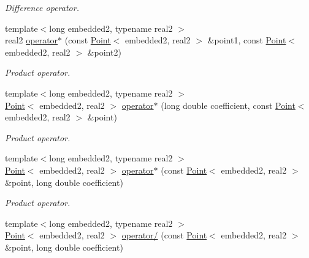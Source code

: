 \begin{DoxyCompactItemize}
\begin{DoxyCompactList}\small\item\em \-Difference operator. \end{DoxyCompactList}\item 
\hypertarget{class_point_afc1da372540656b24f224e7959624c08}{{\footnotesize template$<$long embedded2, typename real2 $>$ }\\real2 \hyperlink{class_point_afc1da372540656b24f224e7959624c08}{operator$\ast$} (const \hyperlink{class_point}{\-Point}$<$ embedded2, real2 $>$ \&point1, const \hyperlink{class_point}{\-Point}$<$ embedded2, real2 $>$ \&point2)}\label{class_point_afc1da372540656b24f224e7959624c08}

\begin{DoxyCompactList}\small\item\em \-Product operator. \end{DoxyCompactList}\item 
\hypertarget{class_point_acaaff0a0864728144ee00bb8772dfd74}{{\footnotesize template$<$long embedded2, typename real2 $>$ }\\\hyperlink{class_point}{\-Point}$<$ embedded2, real2 $>$ \hyperlink{class_point_acaaff0a0864728144ee00bb8772dfd74}{operator$\ast$} (long double coefficient, const \hyperlink{class_point}{\-Point}$<$ embedded2, real2 $>$ \&point)}\label{class_point_acaaff0a0864728144ee00bb8772dfd74}

\begin{DoxyCompactList}\small\item\em \-Product operator. \end{DoxyCompactList}\item 
\hypertarget{class_point_ab2682a3fd01359b9a694b8f8494341e1}{{\footnotesize template$<$long embedded2, typename real2 $>$ }\\\hyperlink{class_point}{\-Point}$<$ embedded2, real2 $>$ \hyperlink{class_point_ab2682a3fd01359b9a694b8f8494341e1}{operator$\ast$} (const \hyperlink{class_point}{\-Point}$<$ embedded2, real2 $>$ \&point, long double coefficient)}\label{class_point_ab2682a3fd01359b9a694b8f8494341e1}

\begin{DoxyCompactList}\small\item\em \-Product operator. \end{DoxyCompactList}\item 
\hypertarget{class_point_a587faaadac82c79e9119d8bc59396c79}{{\footnotesize template$<$long embedded2, typename real2 $>$ }\\\hyperlink{class_point}{\-Point}$<$ embedded2, real2 $>$ \hyperlink{class_point_a587faaadac82c79e9119d8bc59396c79}{operator/} (const \hyperlink{class_point}{\-Point}$<$ embedded2, real2 $>$ \&point, long double coefficient)}\label{class_point_a587faaadac82c79e9119d8bc59396c79}


\end{DoxyCompactItemize}
